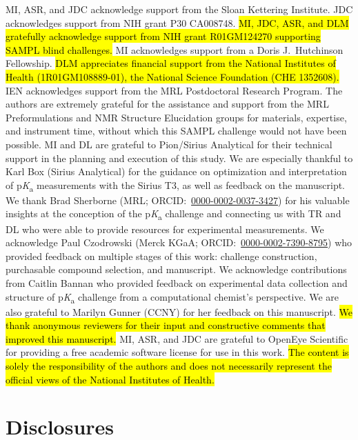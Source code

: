 \documentclass[9pt,lineno]{elife}
\newcommand{\pKa}{p\textit{K}\textsubscript{a}}
\begin{document}
MI, ASR, and JDC acknowledge support from the Sloan Kettering Institute.
JDC acknowledges support from NIH grant P30 CA008748. 
\hl{MI, JDC, ASR, and DLM gratefully acknowledge support from NIH grant R01GM124270 supporting SAMPL blind challenges.}
MI acknowledges support from a Doris J.\ Hutchinson Fellowship. 
\hl{DLM appreciates financial support from the National Institutes of Health (1R01GM108889-01), the National Science Foundation (CHE 1352608).}
IEN acknowledges support from the MRL Postdoctoral Research Program.
The authors are extremely grateful for the assistance and support from the MRL Preformulations and NMR Structure Elucidation groups for materials, expertise, and instrument time, without which this SAMPL challenge would not have been possible.
MI and DL are grateful to Pion/Sirius Analytical for their technical support in the planning and execution of this study. 
We are especially thankful to Karl Box (Sirius Analytical) for the guidance on optimization and interpretation of \pKa{} measurements with the Sirius T3, as well as feedback on the manuscript. 
We thank Brad Sherborne (MRL; ORCID:~\href{https://orcid.org/0000-0002-0037-3427
}{0000-0002-0037-3427}) for his valuable insights at the conception of the \pKa{} challenge and connecting us with TR and DL who were able to provide resources for experimental measurements. 
We acknowledge Paul Czodrowski (Merck KGaA; ORCID:~\href{https://orcid.org/0000-0002-7390-8795}{0000-0002-7390-8795}) who provided feedback on multiple stages of this work: challenge construction, purchasable compound selection, and manuscript. 
We acknowledge contributions from Caitlin Bannan who provided feedback on experimental data collection and structure of \pKa{} challenge from a computational chemist's perspective. 
We are also grateful to Marilyn Gunner (CCNY) for her feedback on this manuscript.
\hl{We thank anonymous reviewers for their input and constructive comments that improved this manuscript.}
MI, ASR, and JDC are grateful to OpenEye Scientific for providing a free academic software license for use in this work.
\hl{The content is solely the responsibility of the authors and does not necessarily represent the official views of the National Institutes of Health.}

\section{Disclosures}
\end{document}
